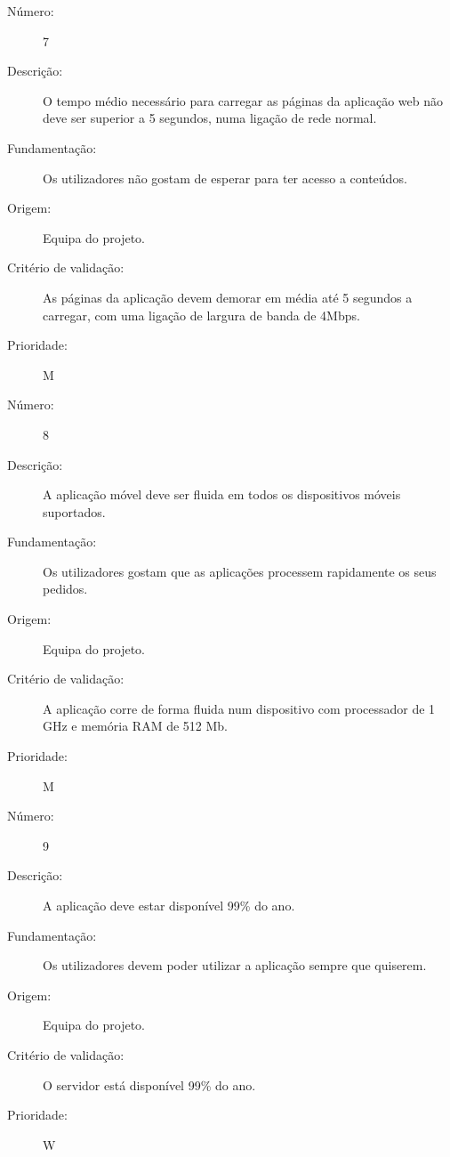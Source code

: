\documentclass{article}
\begin{document}
      \begin{description}
        \item[Número:]7
        \item[Descrição:]O tempo médio necessário para carregar as páginas da aplicação web não deve ser superior a 5 segundos, numa ligação de rede normal.
        \item[Fundamentação:]Os utilizadores não gostam de esperar para ter acesso a conteúdos.
        \item[Origem:]Equipa do projeto.
        \item[Critério de validação:]As páginas da aplicação devem demorar em média até 5 segundos a carregar, com uma ligação de largura de banda de 4Mbps.
        \item[Prioridade:]M
      \end{description}
      \vspace{0.5cm}
            \begin{description}
        \item[Número:]8
        \item[Descrição:]A aplicação móvel deve ser fluida em todos os dispositivos móveis suportados.
        \item[Fundamentação:]Os utilizadores gostam que as aplicações processem rapidamente os seus pedidos.
        \item[Origem:]Equipa do projeto.
        \item[Critério de validação:]A aplicação corre de forma fluida num dispositivo com processador de 1 GHz e memória RAM de 512 Mb.
        \item[Prioridade:]M
      \end{description}
      \vspace{0.5cm}
            \begin{description}
        \item[Número:]9
        \item[Descrição:]A aplicação deve estar disponível 99\% do ano.
        \item[Fundamentação:]Os utilizadores devem poder utilizar a aplicação sempre que quiserem.
        \item[Origem:]Equipa do projeto.
        \item[Critério de validação:]O servidor está disponível 99\% do ano.
        \item[Prioridade:]W
      \end{description}
      \vspace{0.5cm}
\end{document}
